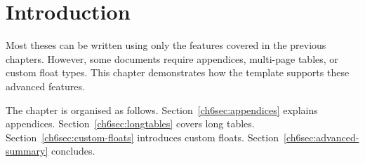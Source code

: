 \section{Introduction}\label{ch6sec:advanced-topics}

Most theses can be written using only the features covered in the previous chapters. However, some documents require appendices, multi-page tables, or custom float types. This chapter demonstrates how the template supports these advanced features.

\begin{figure}[t]
\centering
{}
\label{ch6fig:system}
\end{figure}

The chapter is organised as follows. Section~\ref{ch6sec:appendices} explains appendices. Section~\ref{ch6sec:longtables} covers long tables. Section~\ref{ch6sec:custom-floats} introduces custom floats. Section~\ref{ch6sec:advanced-summary} concludes.

